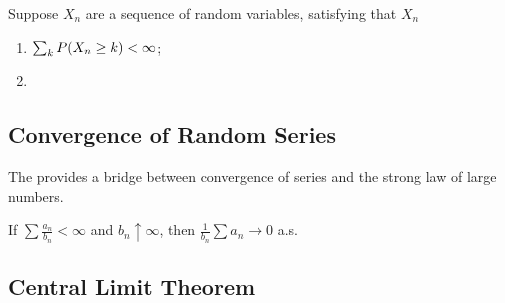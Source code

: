 \begin{thm}
    Suppose \(X_{n}\) are a sequence of random variables, satisfying that \(X_{n}\)
    \begin{enumerate}
        \item \(\sum_{k} P \pqty{X_{n} \geq k} < \infty\);
        \item 
    \end{enumerate}
\end{thm}


\subsection{Convergence of Random Series}

The  provides a bridge between convergence of series and the strong law of large numbers. 
\begin{lemma}
    If \(\sum \frac{a_{n}}{b_{n}} < \infty\) and \(b_{n} \uparrow \infty\), then \(\frac{1}{b_{n}} \sum a_{n} \to 0\) a.s.
\end{lemma}




\subsection{Central Limit Theorem}